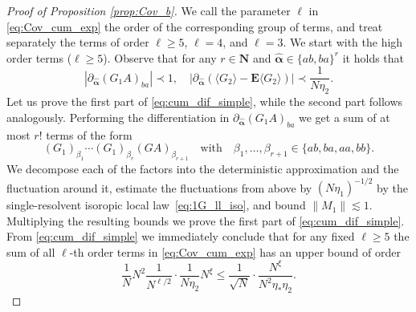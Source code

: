 \documentclass[10pt]{amsart}
\numberwithin{equation}{section}
\newcommand{\E}{\mathbf{E}}
\newcommand{\N}{\mathbf{N}}
\begin{document}
\begin{proof}[Proof of Proposition \ref{prop:Cov_b}]
We call the parameter $\ell$ in \eqref{eq:Cov_cum_exp} the order of the corresponding group of terms, and treat separately the terms of order $\ell\ge 5$, $\ell = 4$, and $\ell=3$. We start with the high order terms ($\ell\ge 5$). Observe that for any $r\in\N$ and $\widehat{\bm{\alpha}}\in \{ab,ba\}^r$ it holds that
\begin{equation}
\left\vert \partial_{\widehat{\bm{\alpha}}} \left(G_1A\right)_{ba}\right\vert \prec 1,\quad \left\vert \partial_{\widehat{\bm{\alpha}}}\left(\langle G_2\rangle - \E\langle G_2\rangle\right) \right\vert \prec \frac{1}{N\eta_2}.
\label{eq:cum_dif_simple}
\end{equation}
Let us prove the first part of \eqref{eq:cum_dif_simple}, while the second part follows analogously. Performing the differentiation in $\partial_{\widehat{\bm{\alpha}}} \left(G_1A\right)_{ba}$ we get a sum of at most $r!$ terms of the form
\begin{equation}
(G_1)_{\beta_1}\cdots (G_1)_{\beta_r}(GA)_{\beta_{r+1}}\quad\text{with}\quad \beta_1,\ldots,\beta_{r+1}\in\{ab,ba,aa,bb\}. 
\label{eq:GA_iso_dif_term}
\end{equation}
We decompose each of the factors into the deterministic approximation and the fluctuation around it, estimate the fluctuations from above by $(N\eta_1)^{-1/2}$ by the single-resolvent isoropic local law~\eqref{eq:1G_ll_iso}, and bound $\|M_1\|\lesssim 1$. Multiplying the resulting bounds we prove the first part of \eqref{eq:cum_dif_simple}. From \eqref{eq:cum_dif_simple} we immediately conclude that for any fixed $\ell\ge 5$ the sum of all $\ell$-th order terms in \eqref{eq:Cov_cum_exp} has an upper bound of order
\begin{equation*}
\frac{1}{N}N^2 \frac{1}{N^{\ell/2}} \cdot  \frac{1}{N\eta_2}N^\xi\le \frac{1}{\sqrt{N}}\cdot\frac{N^\xi}{N^2\eta_*\eta_2}.
\end{equation*}


\end{proof}
\end{document}

